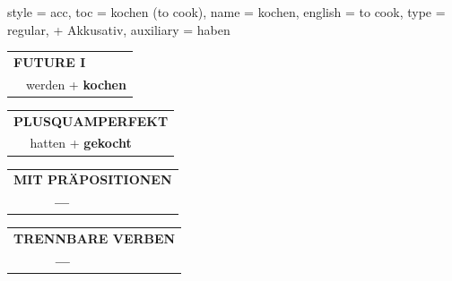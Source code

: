 \begin{verbentry}{
  style = {acc},
  toc = {kochen (to cook)},
  name = {kochen},
  english = {to cook},
  type = {regular, + Akkusativ},
  auxiliary = {haben}
}
\begin{tabular}{rl}
    \multicolumn{2}{l}{\textbf{FUTURE I} }\\
   & werden + \textbf{kochen}\\
 
  \end{tabular}
\hfill
   \begin{tabular}{rl}
      \multicolumn{2}{l}{\textbf{PLUSQUAMPERFEKT}}\\
    & hatten + \textbf{gekocht}\\
  \end{tabular}
  
  
\vspace{10pt}

\begin{tabular}{lll}
\multicolumn{3}{l}{\textbf{MIT PRÄPOSITIONEN}}\\
& \textbf{---} & \\
\end{tabular}
\hfill
\begin{tabular}{lll}
\multicolumn{3}{l}{\textbf{TRENNBARE VERBEN}}\\
& \textbf{---} & \\
\end{tabular}
\vspace{-5pt}
\end{verbentry}

